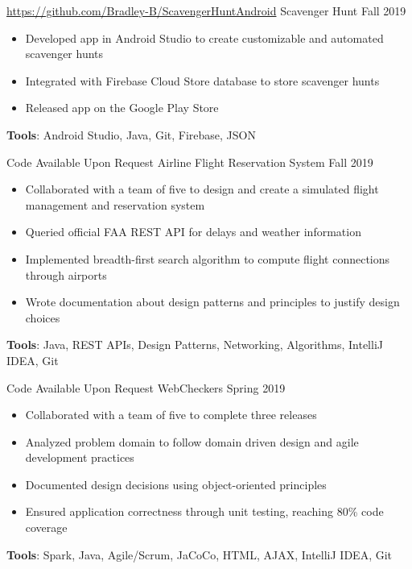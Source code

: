 \documentclass{awesome-cv}
\begin{document}
		\begin{cventries}
			\cventry
				{\href{https://github.com/Bradley-B/ScavengerHuntAndroid}{https://github.com/Bradley-B/ScavengerHuntAndroid}}
				{Scavenger Hunt\small{\textnormal{\color{graytext}{\enskip Personal Project}}}}
				{Fall 2019}
				{}
				{
					\vspace{-0.25cm}
					\begin{itemize}[nosep]
						\item Developed app in Android Studio to create customizable and automated scavenger hunts
						\item Integrated with Firebase Cloud Store database to store scavenger hunts 
						\item Released app on the Google Play Store
					\end{itemize}
					\vspace{0.2cm}
					\qquad \textbf{Tools}: Android Studio, Java, Git, Firebase, JSON
				}

			\cventryB
				{Code Available Upon Request}
				{Airline Flight Reservation System\small{\textnormal{\color{graytext}{\enskip Engineering of Software Subsystems}}}}
				{Fall 2019}
				{}
				{
					\vspace{-0.25cm}
					\begin{itemize}[nosep]
						\item Collaborated with a team of five to design and create a simulated flight management and reservation system
						\item Queried official FAA REST API for delays and weather information
						\item Implemented breadth-first search algorithm to compute flight connections through airports
						\item Wrote documentation about design patterns and principles to justify design choices
					\end{itemize}
					\vspace{0.2cm}
					\qquad \textbf{Tools}: Java, REST APIs, Design Patterns, Networking, Algorithms, IntelliJ IDEA, Git
				}

			\cventryB
				{Code Available Upon Request}
				{WebCheckers\small{\textnormal{\color{graytext}{\enskip Introduction to Software Engineering}}}}
				{Spring 2019}
				{}
				{
					\vspace{-0.25cm}
					\begin{itemize}[nosep]
						\item Collaborated with a team of five to complete three releases
						\item Analyzed problem domain to follow domain driven design and agile development practices
						\item Documented design decisions using object-oriented principles
						\item Ensured application correctness through unit testing, reaching 80\% code coverage
					\end{itemize}
					\vspace{0.2cm}
					\qquad \textbf{Tools}: Spark, Java, Agile/Scrum, JaCoCo, HTML, AJAX, IntelliJ IDEA, Git
				}


\end{cventries}
\end{document}
